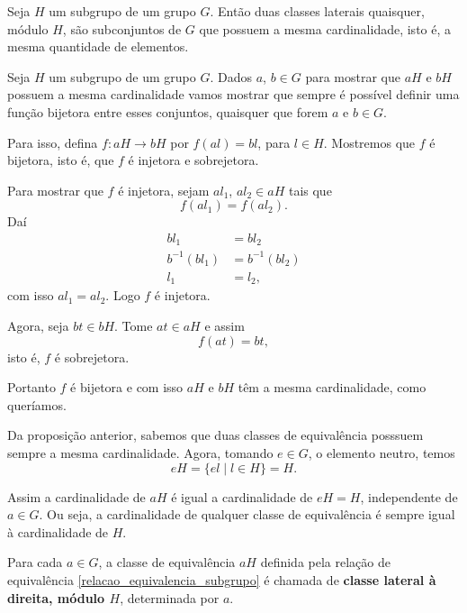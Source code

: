 \begin{proposicao}
    Seja $H$ um subgrupo de um grupo $G$. Então duas classes laterais quaisquer, módulo $H$, são subconjuntos de $G$ que possuem a mesma cardinalidade, isto é, a mesma quantidade de elementos.
\end{proposicao}
\begin{prova}
    Seja $H$ um subgrupo de um grupo $G$. Dados $a$, $b \in G$ para mostrar que $aH$ e $bH$ possuem a mesma cardinalidade vamos mostrar que sempre é possível definir uma função bijetora entre esses conjuntos, quaisquer que forem $a$ e $b \in G$.

    Para isso, defina $f : aH \to bH$ por $f(al) = bl$, para $l \in H$. Mostremos que $f$ é bijetora, isto é, que $f$ é injetora e sobrejetora.

    Para mostrar que $f$ é injetora, sejam $al_1$, $al_2 \in aH$ tais que
    \[
        f(al_1) = f(al_2).
    \]
    Daí
    \begin{align*}
        bl_1 &= bl_2\\
        b^{-1}(bl_1) &= b^{-1}(bl_2)\\
        l_1 &= l_2,
    \end{align*}
    com isso $al_1 = al_2$. Logo $f$ é injetora.

    Agora, seja $bt \in bH$. Tome $at \in aH$ e assim
    \[
        f(at) = bt,
    \]
    isto é, $f$ é sobrejetora.

    Portanto $f$ é bijetora e com isso $aH$ e $bH$ têm a mesma cardinalidade, como queríamos.
\end{prova}

\begin{observacao}
    Da proposição anterior, sabemos que duas classes de equivalência posssuem sempre a mesma cardinalidade. Agora, tomando $e \in G$, o elemento neutro, temos
    \[
        eH = \{el \mid l \in H\} = H.
    \]

    Assim a cardinalidade de $aH$ é igual a cardinalidade de $eH = H$, independente de $a \in G$. Ou seja, a cardinalidade de qualquer classe de equivalência é sempre igual à cardinalidade de $H$.
\end{observacao}

\begin{definicao}
    Para cada $a \in G$, a classe de equivalência $aH$ definida pela relação de equivalência \eqref{relacao_equivalencia_subgrupo} é chamada de \textbf{classe lateral à direita, módulo $H$}, determinada por $a$.
\end{definicao}

